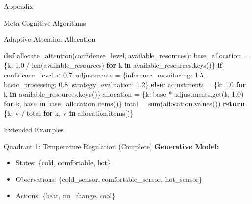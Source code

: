 \documentclass[
  ignorenonframetext,
]{beamer}
\newenvironment{Shaded}{}{}
\newcommand{\BuiltInTok}[1]{\textcolor[rgb]{0.00,0.50,0.00}{#1}}
\newcommand{\ControlFlowTok}[1]{\textcolor[rgb]{0.00,0.44,0.13}{\textbf{#1}}}
\newcommand{\FloatTok}[1]{\textcolor[rgb]{0.25,0.63,0.44}{#1}}
\newcommand{\KeywordTok}[1]{\textcolor[rgb]{0.00,0.44,0.13}{\textbf{#1}}}
\newcommand{\NormalTok}[1]{#1}
\newcommand{\OperatorTok}[1]{\textcolor[rgb]{0.40,0.40,0.40}{#1}}
\newcommand{\StringTok}[1]{\textcolor[rgb]{0.25,0.44,0.63}{#1}}
\providecommand{\tightlist}{%
  \setlength{\itemsep}{0pt}\setlength{\parskip}{0pt}}
\begin{document}
\begin{frame}[fragile]{Appendix}
\begin{block}{Meta-Cognitive Algorithms}
\begin{block}{Adaptive Attention Allocation}
\protect{}\label{adaptive-attention-allocation}
\begin{Shaded}
\begin{Highlighting}[]
\KeywordTok{def}\NormalTok{ allocate\_attention(confidence\_level, available\_resources):}
\NormalTok{    base\_allocation }\OperatorTok{=}\NormalTok{ \{k: }\FloatTok{1.0} \OperatorTok{/} \BuiltInTok{len}\NormalTok{(available\_resources)}
                      \ControlFlowTok{for}\NormalTok{ k }\KeywordTok{in}\NormalTok{ available\_resources.keys()\}}
    \ControlFlowTok{if}\NormalTok{ confidence\_level }\OperatorTok{\textless{}} \FloatTok{0.7}\NormalTok{:}
\NormalTok{        adjustments }\OperatorTok{=}\NormalTok{ \{}\StringTok{\textquotesingle{}inference\_monitoring\textquotesingle{}}\NormalTok{: }\FloatTok{1.5}\NormalTok{,}
                       \StringTok{\textquotesingle{}basic\_processing\textquotesingle{}}\NormalTok{: }\FloatTok{0.8}\NormalTok{,}
                       \StringTok{\textquotesingle{}strategy\_evaluation\textquotesingle{}}\NormalTok{: }\FloatTok{1.2}\NormalTok{\}}
    \ControlFlowTok{else}\NormalTok{:}
\NormalTok{        adjustments }\OperatorTok{=}\NormalTok{ \{k: }\FloatTok{1.0} \ControlFlowTok{for}\NormalTok{ k }\KeywordTok{in}\NormalTok{ available\_resources.keys()\}}
\NormalTok{    allocation }\OperatorTok{=}\NormalTok{ \{k: base }\OperatorTok{*}\NormalTok{ adjustments.get(k, }\FloatTok{1.0}\NormalTok{)}
                 \ControlFlowTok{for}\NormalTok{ k, base }\KeywordTok{in}\NormalTok{ base\_allocation.items()\}}
\NormalTok{    total }\OperatorTok{=} \BuiltInTok{sum}\NormalTok{(allocation.values())}
    \ControlFlowTok{return}\NormalTok{ \{k: v }\OperatorTok{/}\NormalTok{ total }\ControlFlowTok{for}\NormalTok{ k, v }\KeywordTok{in}\NormalTok{ allocation.items()\}}
\end{Highlighting}
\end{Shaded}
\end{block}
\end{block}

\begin{block}{Extended Examples}
\protect{}\label{sec:extended_examples}
\begin{block}{Quadrant 1: Temperature Regulation (Complete)}
\protect{}\label{quadrant-1-temperature-regulation-complete}
\textbf{Generative Model:}

\begin{itemize}
\tightlist
\item
  States: \{cold, comfortable, hot\}
\item
  Observations: \{cold\_sensor, comfortable\_sensor, hot\_sensor\}
\item
  Actions: \{heat, no\_change, cool\}
\end{itemize}


\end{block}
\end{block}
\end{frame}
\end{document}
